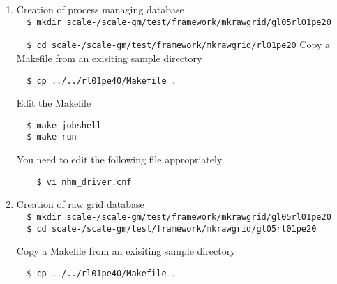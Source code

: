 \begin{enumerate}

\item{Creation of process managing database}  \\
\verb|  $ mkdir scale-|{\version}\verb|/scale-gm/test/framework/mkrawgrid/gl05rl01pe20|

\verb|  $ cd scale-|{\version}\verb|/scale-gm/test/framework/mkrawgrid/rl01pe20|
Copy a Makefile from an exisiting sample directory
\begin{verbatim}
  $ cp ../../rl01pe40/Makefile .
\end{verbatim}

Edit the Makefile

\vspace{-4mm}
\begin{verbatim}
  $ make jobshell
  $ make run
\end{verbatim}
You need to edit the following file appropriately
 \begin{verbatim}
    $ vi nhm_driver.cnf
\end{verbatim}

\item{Creation of raw grid database} \\
\verb|  $ mkdir scale-|{\version}\verb|/scale-gm/test/framework/mkrawgrid/gl05rl01pe20| \\
\verb|  $ cd scale-|{\version}\verb|/scale-gm/test/framework/mkrawgrid/gl05rl01pe20|

Copy a Makefile from an exisiting sample directory
\begin{verbatim}
  $ cp ../../rl01pe40/Makefile .
\end{verbatim}


\end{enumerate}
